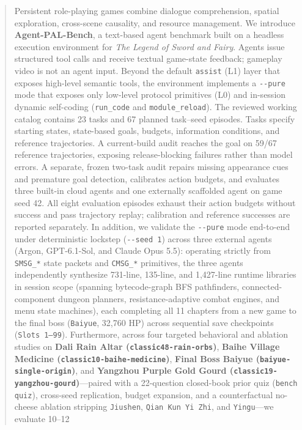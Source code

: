 \documentclass[11pt,a4paper]{article}
\begin{document}
\begin{abstract}

Persistent role-playing games combine dialogue comprehension, spatial exploration, cross-scene causality, and resource management. We introduce \textbf{Agent-PAL-Bench}, a text-based agent benchmark built on a headless execution environment for \emph{The Legend of Sword and Fairy}. Agents issue structured tool calls and receive textual game-state feedback; gameplay video is not an agent input. Beyond the default \texttt{assist} (L1) layer that exposes high-level semantic tools, the environment implements a \texttt{-\allowbreak{}-\allowbreak{}pure} mode that exposes only low-level protocol primitives (L0) and in-session dynamic self-coding (\texttt{run\allowbreak{}\_\allowbreak{}code} and \texttt{module\allowbreak{}\_\allowbreak{}reload}). The reviewed working catalog contains 23 tasks and 67 planned task--seed episodes. Tasks specify starting states, state-based goals, budgets, information conditions, and reference trajectories. A current-build audit reaches the goal on 59/67 reference trajectories, exposing release-blocking failures rather than model errors. A separate, frozen two-task audit repairs missing appearance cues and premature goal detection, calibrates action budgets, and evaluates three built-in cloud agents and one externally scaffolded agent on game seed 42. All eight evaluation episodes exhaust their action budgets without success and pass trajectory replay; calibration and reference successes are reported separately. In addition, we validate the \texttt{-\allowbreak{}-\allowbreak{}pure} mode end-to-end under deterministic lockstep (\texttt{-\allowbreak{}-\allowbreak{}seed\allowbreak{} \allowbreak{}1}) across three external agents (Argon, GPT-6.1-Sol, and Claude Opus 5.5): operating strictly from \texttt{SMSG\allowbreak{}\_\allowbreak{}*} state packets and \texttt{CMSG\allowbreak{}\_\allowbreak{}*} primitives, the three agents independently synthesize 731-line, 135-line, and 1,427-line runtime libraries in session scope (spanning bytecode-graph BFS pathfinders, connected-component dungeon planners, resistance-adaptive combat engines, and menu state machines), each completing all 11 chapters from a new game to the final boss (\texttt{Baiyue}, 32,760 HP) across sequential save checkpoints (\texttt{Slots\allowbreak{} \allowbreak{}1--99}). Furthermore, across four targeted behavioral and ablation studies on \textbf{Dali Rain Altar (\texttt{classic48\allowbreak{}-\allowbreak{}rain\allowbreak{}-\allowbreak{}orbs})}, \textbf{Baihe Village Medicine (\texttt{classic10\allowbreak{}-\allowbreak{}baihe\allowbreak{}-\allowbreak{}medicine})}, \textbf{Final Boss Baiyue (\texttt{baiyue\allowbreak{}-\allowbreak{}single\allowbreak{}-\allowbreak{}origin})}, and \textbf{Yangzhou Purple Gold Gourd (\texttt{classic19\allowbreak{}-\allowbreak{}yangzhou\allowbreak{}-\allowbreak{}gourd})}---paired with a 22-question closed-book prior quiz (\texttt{bench\allowbreak{} \allowbreak{}quiz}), cross-seed replication, budget expansion, and a counterfactual no-cheese ablation stripping \texttt{Jiushen}, \texttt{Qian\allowbreak{} \allowbreak{}Kun\allowbreak{} \allowbreak{}Yi\allowbreak{} \allowbreak{}Zhi}, and \texttt{Yingu}---we evaluate 10--12 
\end{abstract}
\end{document}

